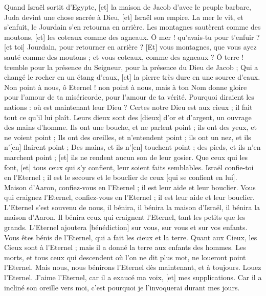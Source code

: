 \begin{multicols}{2}
\VerseOne{}Quand Israël sortit d'Egypte, [et] la maison de Jacob d'avec le peuple barbare,
Juda devint une chose sacrée à Dieu, [et] Israël son empire.
La mer le vit, et s'enfuit, le Jourdain s'en retourna en arrière.
Les montagnes sautèrent comme des moutons, [et] les coteaux comme des agneaux.
Ô mer ! qu'avais-tu pour t'enfuir ? [et toi] Jourdain, pour retourner en arrière ?
[Et] vous montagnes, que vous ayez sauté comme des moutons ; et vous coteaux, comme des agneaux ?
Ô terre ! tremble pour la présence du Seigneur, pour la présence du Dieu de Jacob ;
Qui a changé le rocher en un étang d'eaux, [et] la pierre très dure en une source d'eaux.
\VerseOne{}Non point à nous, ô Eternel ! non point à nous, mais à ton Nom donne gloire pour l'amour de ta miséricorde, pour l'amour de ta vérité.
Pourquoi diraient les nations : où est maintenant leur Dieu ?
Certes notre Dieu est aux cieux ; il fait tout ce qu'il lui plaît.
Leurs dieux sont des [dieux] d'or et d'argent, un ouvrage des mains d'homme.
Ils ont une bouche, et ne parlent point ; ils ont des yeux, et ne voient point ;
Ils ont des oreilles, et n'entendent point ; ils ont un nez, et ils n'[en] flairent point ;
Des mains, et ils n'[en] touchent point ; des pieds, et ils n'en marchent point ; [et] ils ne rendent aucun son de leur gosier.
Que ceux qui les font, [et] tous ceux qui s'y confient, leur soient faits semblables.
Israël confie-toi en l'Eternel ; il est le secours et le bouclier de ceux [qui se confient en lui].
Maison d'Aaron, confiez-vous en l'Eternel ; il est leur aide et leur bouclier.
Vous qui craignez l'Eternel, confiez-vous en l'Eternel ; il est leur aide et leur bouclier.
L'Eternel s'est souvenu de nous, il bénira, il bénira la maison d'Israël, il bénira la maison d'Aaron.
Il bénira ceux qui craignent l'Eternel, tant les petits que les grands.
L'Eternel ajoutera [bénédiction] sur vous, sur vous et sur vos enfants.
Vous êtes bénis de l'Eternel, qui a fait les cieux et la terre.
Quant aux Cieux, les Cieux sont à l'Eternel ; mais il a donné la terre aux enfants des hommes.
Les morts, et tous ceux qui descendent où l'on ne dit plus mot, ne loueront point l'Eternel.
Mais nous, nous bénirons l'Eternel dès maintenant, et à toujours. Louez l'Eternel.
\VerseOne{}J'aime l'Eternel, car il a exaucé ma voix, [et] mes supplications.
Car il a incliné son oreille vers moi, c'est pourquoi je l'invoquerai durant mes jours.

\end{multicols}
